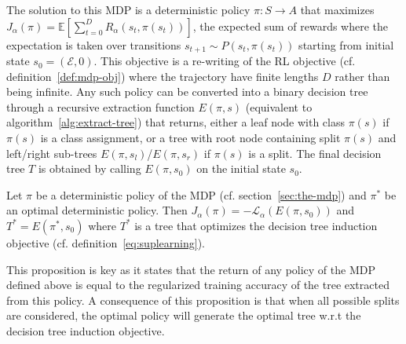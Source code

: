 The solution to this MDP is a deterministic policy $\pi: S \rightarrow A$ that maximizes {$J_{\alpha}(\pi) ={\mathbb{E}}\left[\sum_{t = 0}^D R_{\alpha}(s_t, \pi(s_t))\right]$\label{def:finite-mdp-obj}}, the expected sum of rewards where the expectation is taken over transitions $s_{t+1}\sim P(s_t, \pi(s_t))$ starting from initial state $s_0 = (\mathcal{E}, 0)$.
This objective is a re-writing of the RL objective (cf. definition~\ref{def:mdp-obj}) where the trajectory have finite lengths $D$ rather than being infinite.
Any such policy can be converted into a binary decision tree through a recursive extraction function $E(\pi, s)$ (equivalent to algorithm~\ref{alg:extract-tree}) that returns, either a leaf node with class $\pi(s)$ if $\pi(s)$ is a class assignment, or a tree with root node containing split $\pi(s)$ and left/right sub-trees $E(\pi, s_l)$/$E(\pi, s_r)$ if $\pi(s)$ is a split. The final decision tree $T$ is obtained by calling $E(\pi, s_0)$ on the initial state $s_0$. 

\begin{proposition}\label{prop:equiv}
Let $\pi$ be a deterministic policy of the MDP (cf. section~\ref{sec:the-mdp}) and $\pi^*$ be an optimal deterministic policy. 
Then $J_\alpha(\pi) = -{\mathcal L}_\alpha(E(\pi, s_0))$ and $T^* = E(\pi^*, s_0)$ where $T^*$ is a tree that optimizes the decision tree induction objective (cf. definition~\ref{eq:suplearning}).
\end{proposition}
This proposition is key as it states that the return of any policy of the MDP defined above is equal to the regularized training accuracy of the tree extracted from this policy.
A consequence of this proposition is that when all possible splits are considered, the optimal policy will generate the optimal tree w.r.t the decision tree induction objective.

